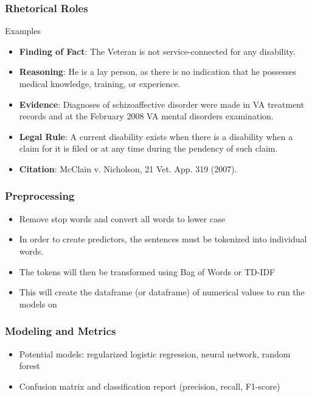 \documentclass{beamer}
\begin{document}
\begin{frame}
  \frametitle{Rhetorical Roles}
  \footnotesize
  Examples
  \begin{itemize}
  \item \textbf{Finding of Fact}: The Veteran is not service-connected for any disability.
  \item \textbf{Reasoning}: He is a lay person, as there is no indication that he possesses medical knowledge, training, or experience.
  \item \textbf{Evidence}: Diagnoses of schizoaffective disorder were made in VA treatment records and at the February 2008 VA mental disorders examination.
  \item \textbf{Legal Rule}: A current disability exists when there is a disability when a claim for it is filed or at any time during the pendency of such claim.
  \item \textbf{Citation}: McClain v. Nicholson, 21 Vet. App. 319 (2007).
  \end{itemize}
\end{frame}



\begin{frame}
  \frametitle{Preprocessing}
  \footnotesize
  \begin{itemize}
  \item Remove stop words and convert all words to lower case
  \item In order to create predictors, the sentences must be tokenized into individual words.
  \item The tokens will then be transformed using Bag of Words or TD-IDF
  \item This will create the dataframe (or dataframe) of numerical values to run the models on
  \end{itemize}
\end{frame}

\begin{frame}
  \frametitle{Modeling and Metrics}
  \begin{itemize}
  \item Potential models: regularized logistic regression, neural network, random forest
  \item Confusion matrix and classification report (precision, recall, F1-score)
  \end{itemize}
\end{frame}
\end{document}
